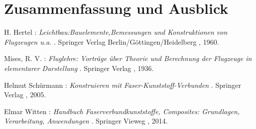 \documentclass[a4paper,12p]{article}
\begin{document}
\section{Zusammenfassung und Ausblick}
\begin{thebibliography}{99}          
	H. Hertel :
	\textit { Leichtbau:Bauelemente,Bemessungen und Konstruktionen von Flugzeugen u.a. }.
	Springer Verlag Berlin/Göttingen/Heidelberg , 1960.
	
	Mises, R. V. :
	\textit { Fluglehre: Vorträge über Theorie und Berechnung der Flugzeuge in elementarer Darstellung }.
	Springer Verlag , 1936.
	
	Helmut Schürmann :
	\textit { Konstruieren mit Faser-Kunststoff-Verbunden }.
	Springer Verlag , 2005.
	
	Elmar Witten :
	\textit { Handbuch Faserverbundkunststoffe, Composites: Grundlagen, Verarbeitung, Anwendungen }.
	Springer Vieweg , 2014.
	
	
	



	
	
\end{thebibliography}






	
\end{document}
